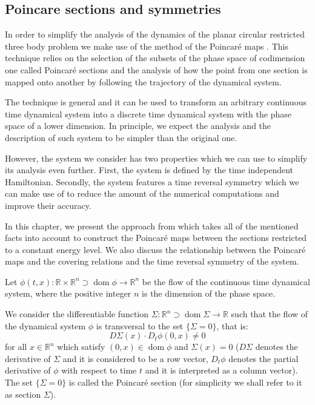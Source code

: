 \documentclass[1p]{article}
\DeclareMathOperator{\dom}{dom}
\begin{document}
\subsection{Poincare sections and symmetries}
\label{subsec:poincare_sections}
In order to simplify the analysis of the dynamics of the planar circular restricted three body problem we make use of the method of the Poincar\'e maps \cite{poincaré1890probleme}. This technique relies on the selection of the subsets of the phase space of codimension one called Poincar\'e sections and the analysis of how the point from one section is mapped onto another by following the trajectory of the dynamical system.

The technique is general and it can be used to transform an arbitrary continuous time dynamical system into a discrete time dynamical system with the phase space of a lower dimension. In principle, we expect the analysis and the description of such system to be simpler than the original one.

However, the system we consider has two properties which we can use to simplify its analysis even further. First, the system is defined by the time independent Hamiltonian. Secondly, the system features a time reversal symmetry which we can make use of to reduce the amount of the numerical computations and improve their accuracy.

In this chapter, we present the approach from \cite{CAPINSKI2026109173} which takes all of the mentioned facts into account to construct the Poincar\'e maps between the sections restricted to a constant energy level. We also discuss the relationship between the Poincar\'e maps and the covering relations and the time reversal symmetry of the system.

Let $\phi (t,x) : \mathbb{R} \times \mathbb{R}^{n} \supset \dom\phi \to \mathbb{R}^{n}$ be the flow of the continuous time dynamical system, where the positive integer $n$ is the dimension of the phase space.

We consider the differentiable function $\Sigma: \mathbb{R}^{n} \supset \dom\Sigma \to \mathbb{R}$ such that the flow of the dynamical system $\phi$ is transversal to the set $\{ \Sigma = 0 \}$, that is:
\[
    D\Sigma (x) \cdot D_t \phi(0,x) \neq 0
\]
for all $x \in \mathbb{R}^n$ which satisfy $(0,x) \in \dom \phi$ and $\Sigma(x) = 0$ ($D\Sigma$ denotes the derivative of $\Sigma$ and it is considered to be a row vector, $D_t \phi$ denotes the partial derivative of $\phi$ with respect to time $t$ and it is interpreted as a column vector). The set $\{ \Sigma = 0 \}$ is called the Poincar\'e section (for simplicity we shall refer to it as section $\Sigma$).
\end{document}
